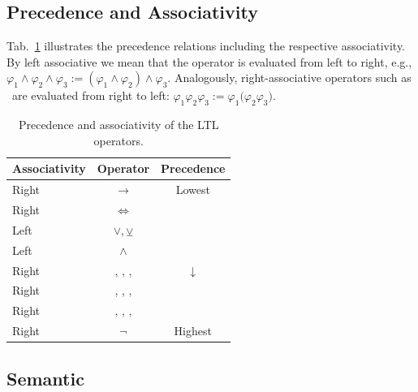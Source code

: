 \subsection{Precedence and Associativity}
Tab.~\ref{prec} illustrates the precedence relations including the respective associativity. By left associative we mean that the operator is evaluated from left to right, e.g., $\varphi_1\land \varphi_2 \land \varphi_3 := (\varphi_1\land \varphi_2) \land \varphi_3$. Analogously, right-associative operators such as \until~are evaluated from right to left: $\varphi_1$\until$\varphi_2$\until$\varphi_3 := \varphi_1$\until$(\varphi_2$\until$\varphi_3)$.
\begin{table}[!tpb]\centering
	\vspace*{2mm}
	\caption{Precedence and associativity of the LTL operators.}
	\center
	\begin{tabular}{@{}lcc@{}} \toprule
		\textbf{Associativity} & \textbf{Operator} & \textbf{Precedence}\\ \midrule
		Right & $\rightarrow$  &Lowest\\
		Right & $\iff$  &\\
		Left & $\lor, \veebar$ & \\  
		Left & $\land$ &  \\  
		Right & \until, \release, \since, \trigger & $\downarrow$\\  
		Right & \globally, \future, \historically, \once & \\  
		Right & \strongNext, \weakNext, \strongPrevious, \weakPrevious & \\
		Right & $\neg$ & Highest\\  
		\bottomrule
	\end{tabular}
	\label{tab:monitor_parameters}
	\label{prec}
\end{table} 

\subsection{Semantic}
